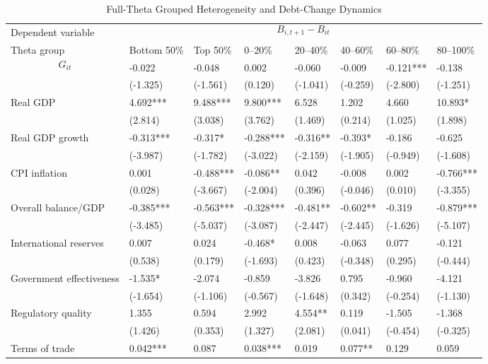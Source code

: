 \begin{table}[H]\centering
\begin{threeparttable}
\caption{Full-Theta Grouped Heterogeneity and Debt-Change Dynamics}
\label{tab:theta_group_heterogeneity_debt}
\scriptsize
\begin{tabularx}{\textwidth}{lYYYYYYY}
\toprule
Dependent variable &  \\
\cmidrule(lr){2-8}
Theta group & Bottom 50\% & Top 50\% & 0--20\% & 20--40\% & 40--60\% & 60--80\% & 80--100\% \\
\midrule
$$G_{it}$$ & -0.022 & -0.048 & 0.002 & -0.060 & -0.009 & -0.121*** & -0.138 \\
  & (-1.325) & (-1.561) & (0.120) & (-1.041) & (-0.259) & (-2.800) & (-1.251) \\
Real GDP & 4.692*** & 9.488*** & 9.800*** & 6.528 & 1.202 & 4.660 & 10.893* \\
  & (2.814) & (3.038) & (3.762) & (1.469) & (0.214) & (1.025) & (1.898) \\
Real GDP growth & -0.313*** & -0.317* & -0.288*** & -0.316** & -0.393* & -0.186 & -0.625 \\
  & (-3.987) & (-1.782) & (-3.022) & (-2.159) & (-1.905) & (-0.949) & (-1.608) \\
CPI inflation & 0.001 & -0.488*** & -0.086** & 0.042 & -0.008 & 0.002 & -0.766*** \\
  & (0.028) & (-3.667) & (-2.004) & (0.396) & (-0.046) & (0.010) & (-3.355) \\
Overall balance/GDP & -0.385*** & -0.563*** & -0.328*** & -0.481** & -0.602** & -0.319 & -0.879*** \\
  & (-3.485) & (-5.037) & (-3.087) & (-2.447) & (-2.445) & (-1.626) & (-5.107) \\
International reserves & 0.007 & 0.024 & -0.468* & 0.008 & -0.063 & 0.077 & -0.121 \\
  & (0.538) & (0.179) & (-1.693) & (0.423) & (-0.348) & (0.295) & (-0.444) \\
Government effectiveness & -1.535* & -2.074 & -0.859 & -3.826 & 0.795 & -0.960 & -4.121 \\
  & (-1.654) & (-1.106) & (-0.567) & (-1.648) & (0.342) & (-0.254) & (-1.130) \\
Regulatory quality & 1.355 & 0.594 & 2.992 & 4.554** & 0.119 & -1.505 & -1.368 \\
  & (1.426) & (0.353) & (1.327) & (2.081) & (0.041) & (-0.454) & (-0.325) \\
Terms of trade & 0.042*** & 0.087 & 0.038*** & 0.019 & 0.077** & 0.129 & 0.059 \\

\end{tabularx}
\end{threeparttable}
\end{table}
